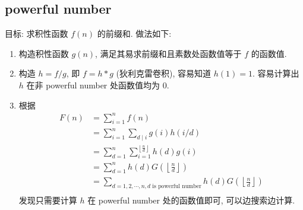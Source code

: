 \documentclass[UTF8, a4paper, titlepage, twoside]{ctexart}
\begin{document}
\subsection{ powerful number }
目标: 求积性函数 \(f(n)\) 的前缀和. 做法如下:
\begin{enumerate}
    \item 构造积性函数 \(g(n)\), 满足其易求前缀和且素数处函数值等于 \(f\) 的函数值.
    \item 构造 \(h = f / g\), 即 \(f = h * g\) (狄利克雷卷积), 容易知道 \(h(1) = 1\). 容易计算出 \(h\) 在非 powerful number 处函数值均为 \(0\).
    \item 根据
          \[
              \begin{aligned}
                  F(n) & = \sum_{i=1}^{n} f(n)                                                                                            \\
                       & = \sum_{i=1}^{n} \sum_{d \mid i} g(i) h(i / d)                                                                   \\
                       & = \sum_{d=1}^{n} \sum_{i=1}^{\left\lfloor\frac{n}{d}\right\rfloor} h(d) g(i)                                     \\
                       & = \sum_{d=1}^{n} h(d) G\left(\left\lfloor\frac{n}{d}\right\rfloor\right)                                         \\
                       & = \sum_{d=1, 2, \cdots, n, d \text{ is powerful number}} h(d) G\left(\left\lfloor\frac{n}{d}\right\rfloor\right) \\
              \end{aligned}
          \]
          发现只需要计算 \(h\) 在 powerful number 处的函数值即可, 可以边搜索边计算.
\end{enumerate}
\end{document}
